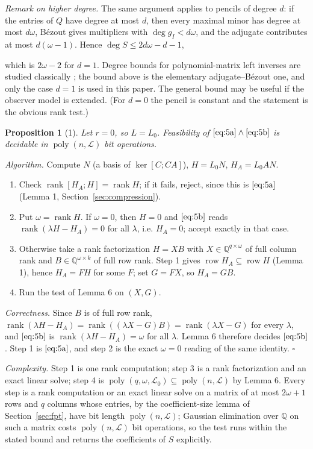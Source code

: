 \documentclass[journal]{IEEEtran}
\theoremstyle{plainn}
\newtheorem*{prop}{Proposition}
\begin{document}
\emph{Remark on higher degree.} The same argument applies to pencils of degree $d$: if the entries of $Q$ have degree at most $d$, then every maximal minor has degree at most $d\omega$, B\'ezout gives multipliers with $\deg g_I<d\omega$, and the adjugate contributes at most $d(\omega-1)$. Hence $\deg S\le 2d\omega-d-1$,

which is $2\omega-2$ for $d=1$. Degree bounds for polynomial-matrix left inverses are studied classically \cite{fab90}; the bound above is the elementary adjugate--B\'ezout one, and only the case $d=1$ is used in this paper. The general bound may be useful if the observer model is extended. (For $d=0$ the pencil is constant and the statement is the obvious rank test.)

\begin{prop}[1] Let $r=0$, so $L=L_0$. Feasibility of $\eqref{eq:5a}\wedge\eqref{eq:5b}$ is decidable in $\operatorname{poly}(n,\mathcal L)$ bit operations.
\end{prop}

\emph{Algorithm.} Compute $N$ (a basis of $\ker[C;CA]$), $H=L_0N$, $H_A=L_0AN$.

\begin{enumerate}
\item Check $\operatorname{rank}[H_A;H]=\operatorname{rank}H$; if it fails, reject, since this is $\eqref{eq:5a}$ (Lemma 1, Section~\ref{sec:compression}).
\item Put $\omega=\operatorname{rank}H$. If $\omega=0$, then $H=0$ and $\eqref{eq:5b}$ reads $\operatorname{rank}(\lambda H-H_A)=0$ for all $\lambda$, i.e. $H_A=0$; accept exactly in that case.
\item Otherwise take a rank factorization $H=XB$ with $X\in\mathbb Q^{q\times\omega}$ of full column rank and $B\in\mathbb Q^{\omega\times k}$ of full row rank. Step 1 gives $\operatorname{row}H_A\subseteq\operatorname{row}H$ (Lemma 1), hence $H_A=FH$ for some $F$; set $G=FX$, so $H_A=GB$.
\item Run the test of Lemma 6 on $(X,G)$.
\end{enumerate}
\emph{Correctness.} Since $B$ is of full row rank, $\operatorname{rank}(\lambda H-H_A)=\operatorname{rank}((\lambda X-G)B) =\operatorname{rank}(\lambda X-G)$ for every $\lambda$, and $\eqref{eq:5b}$ is $\operatorname{rank}(\lambda H-H_A)=\omega$ for all $\lambda$. Lemma 6 therefore decides $\eqref{eq:5b}$. Step 1 is $\eqref{eq:5a}$, and step 2 is the exact $\omega=0$ reading of the same identity. $\square$

\emph{Complexity.} Step 1 is one rank computation; step 3 is a rank factorization and an
exact linear solve; step 4 is $\operatorname{poly}(q,\omega,\mathcal L_0)\subseteq\operatorname{poly}(n,\mathcal L)$ by Lemma 6. Every step is a rank computation or an exact linear solve on a matrix of at most
$2\omega+1$ rows and $q$ columns whose entries, by the coefficient-size lemma of
Section~\ref{sec:fpt}, have bit length $\operatorname{poly}(n,\mathcal L)$; Gaussian
elimination over $\mathbb Q$ on such a matrix costs
$\operatorname{poly}(n,\mathcal L)$ bit operations, so the test runs within the stated
bound and returns the coefficients of $S$ explicitly.
\end{document}
